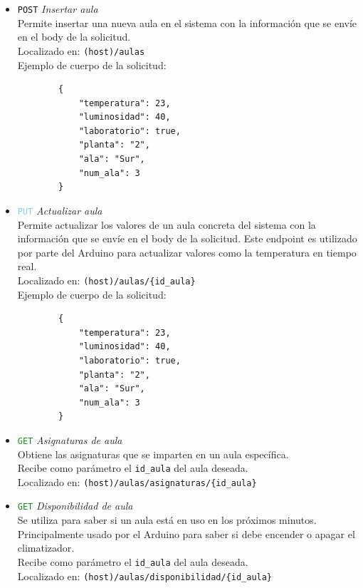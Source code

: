 \documentclass[12pt]{report}
\begin{document}
\begin{itemize}
\begin{itemize}
        \item \textcolor{YellowOrange}{\texttt{POST}} \textit{Insertar aula}\\
        Permite insertar una nueva aula en el sistema con la información que se envíe en el body de la solicitud.\\
        Localizado en: \texttt{(host)/aulas}
        \\Ejemplo de cuerpo de la solicitud:
        \begin{verbatim}
        {
            "temperatura": 23,
            "luminosidad": 40,
            "laboratorio": true,
            "planta": "2",
            "ala": "Sur",
            "num_ala": 3
        }
        \end{verbatim}
        
        \item \textcolor{SkyBlue}{\texttt{PUT}} \textit{Actualizar aula}\\
        Permite actualizar los valores de un aula concreta del sistema con la información que se envíe en el body de la solicitud. Este endpoint es utilizado por parte del Arduino para actualizar valores como la temperatura en tiempo real.\\
        Localizado en: \texttt{(host)/aulas/\{id\_aula\}}
        \\Ejemplo de cuerpo de la solicitud:
        \begin{verbatim}
        {
            "temperatura": 23,
            "luminosidad": 40,
            "laboratorio": true,
            "planta": "2",
            "ala": "Sur",
            "num_ala": 3
        }
        \end{verbatim}
        
        \item \textcolor{ForestGreen}{\texttt{GET}} \textit{Asignaturas de aula}\\
        Obtiene las asignaturas que se imparten en un aula específica.\\
        Recibe como parámetro el \texttt{id\_aula} del aula deseada.\\
        Localizado en: \texttt{(host)/aulas/asignaturas/\{id\_aula\}}
    
        \item \textcolor{ForestGreen}{\texttt{GET}} \textit{Disponibilidad de aula}\\
        Se utiliza para saber si un aula está en uso en los próximos minutos. Principalmente usado por el Arduino para saber si debe encender o apagar el climatizador.\\
        Recibe como parámetro el \texttt{id\_aula} del aula deseada.\\
        Localizado en: \texttt{(host)/aulas/disponibilidad/\{id\_aula\}}
    

\end{itemize}
\end{itemize}
\end{document}

